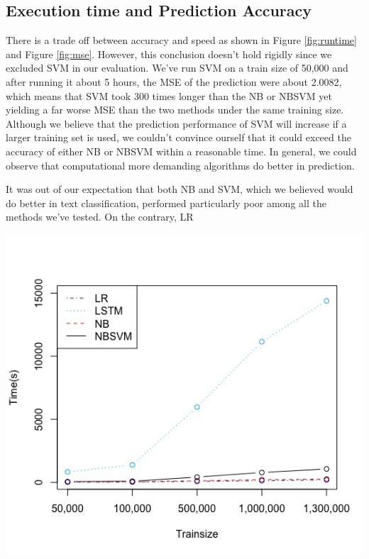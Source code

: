 \documentclass[letterpaper]{article} %
\begin{document}
\subsection{Execution time and Prediction Accuracy}
There is a trade off between accuracy and speed as shown in Figure \ref{fig:runtime} and Figure \ref{fig:mse}. However, this conclusion doesn't hold rigidly since we excluded SVM in our evaluation. We've run SVM on a train size of 50,000 and after running it about 5 hours, the MSE of the prediction were about 2.0082, which means that SVM took 300 times longer than the NB or NBSVM yet yielding a far worse MSE than the two methods under the same training size. Although we believe that the prediction performance of SVM will increase if a larger training set is used, we couldn't convince ourself that it could exceed the accuracy of either NB or NBSVM within a reasonable time. In general, we could observe that computational more demanding algorithms do better in prediction.

It was out of our expectation that both NB and SVM, which we believed would do better in text classification, performed particularly poor among all the methods we've tested. On the contrary, LR 


\begin{center}
\centering
\label{fig:runtime}
\includegraphics[width=\columnwidth]{../Plots/Compare_runtime.jpeg}
\end{center}
\end{document}
